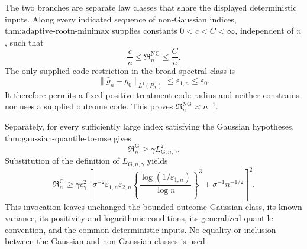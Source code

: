 The two branches are separate law classes that share the displayed deterministic inputs. Along every indicated sequence of non-Gaussian indices, \(\text{thm:adaptive-rootn-minimax}\) supplies constants \(0<c<C<\infty\), independent of \(n\), such that
\[
 \frac cn\le\mathfrak R_n^{\mathrm{NG}}\le\frac Cn.
\]
The only supplied-code restriction in the broad spectral class is
\[
 \|\bar g_n-g_0\|_{L^1(P_X)}\le\varepsilon_{1,n}\le\varepsilon_0.
\]
It therefore permits a fixed positive treatment-code radius and neither constrains nor uses a supplied outcome code. This proves \(\mathfrak R_n^{\mathrm{NG}}\asymp n^{-1}\).

Separately, for every sufficiently large index satisfying the Gaussian hypotheses, \(\text{thm:gaussian-quantile-to-mse}\) gives
\[
 \mathfrak R_n^{\mathrm G}\ge\gamma L_{\mathrm G,n,\gamma}^2.
\]
Substitution of the definition of \(L_{\mathrm G,n,\gamma}\) yields
\[
 \mathfrak R_n^{\mathrm G}
 \ge\gamma c_{\gamma}^2
 \left[
  \sigma^{-2}\varepsilon_{1,n}\varepsilon_{2,n}
  \left\{\frac{\log(1/\varepsilon_{1,n})}{\log n}\right\}^3
  +\sigma^{-1}n^{-1/2}
 \right]^2.
\]
This invocation leaves unchanged the bounded-outcome Gaussian class, its known variance, its positivity and logarithmic conditions, its generalized-quantile convention, and the common deterministic inputs. No equality or inclusion between the Gaussian and non-Gaussian classes is used.